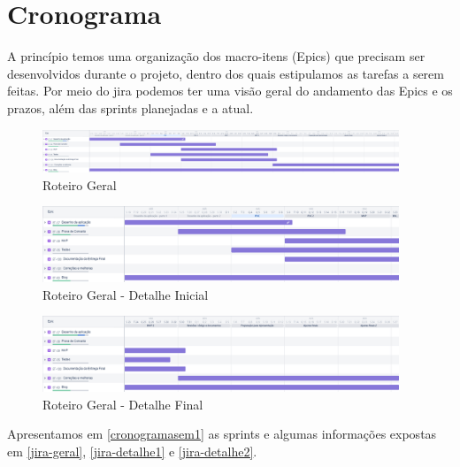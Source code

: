 \section{Cronograma}

A princípio temos uma organização dos macro-itens (Epics) que precisam ser desenvolvidos durante o projeto, dentro dos quais estipulamos as tarefas a serem feitas. Por meio do \gls{jira} podemos ter uma visão geral do andamento das Epics e os prazos, além das \glspl{sprint} planejadas e a atual.

\begin{figure}[H]
	\centering
	\caption{\label{jira-geral}Roteiro Geral}
	\includegraphics[width=0.95\textwidth]{../imagens/cronograma-geral.png}
\end{figure}

\begin{figure}[H]
	\centering
	\caption{\label{jira-detalhe1}Roteiro Geral - Detalhe Inicial}
	\includegraphics[width=0.95\textwidth]{../imagens/cronograma-detalhe1.png}
\end{figure}

\begin{figure}[H]
	\centering
	\caption{\label{jira-detalhe2}Roteiro Geral - Detalhe Final}
	\includegraphics[width=0.95\textwidth]{../imagens/cronograma-detalhe2.png}
\end{figure}

Apresentamos em \autoref{cronogramasem1} as \glspl{sprint} e algumas informações expostas em \autoref{jira-geral}, \autoref{jira-detalhe1} e \autoref{jira-detalhe2}.


